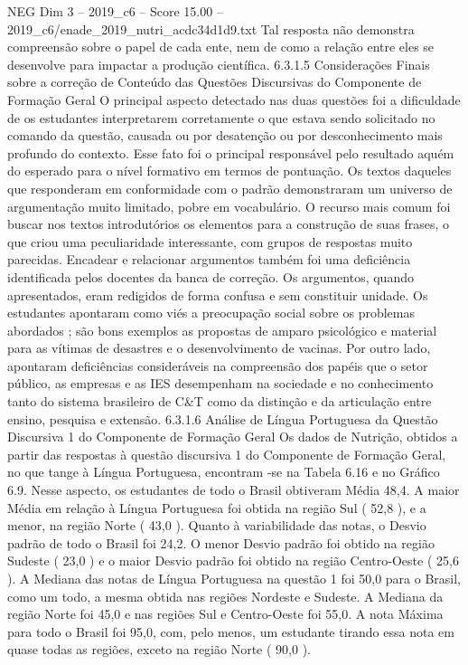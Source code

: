 \begin{textsample}{NEG Dim 3 – 2019\_c6 – Score 15.00 – 2019\_c6/enade\_2019\_nutri\_acdc34d1d9.txt}
Tal resposta não demonstra compreensão sobre o papel de cada ente, nem de como a relação entre eles se desenvolve para impactar a produção científica. 6.3.1.5 Considerações Finais sobre a correção de Conteúdo das Questões Discursivas do Componente de Formação Geral O principal aspecto detectado nas duas questões foi a dificuldade de os estudantes interpretarem corretamente o que estava sendo solicitado no comando da questão, causada ou por desatenção ou por desconhecimento mais profundo do contexto.
Esse fato foi o principal responsável pelo resultado aquém do esperado para o nível formativo em termos de pontuação.
Os textos daqueles que responderam em conformidade com o padrão demonstraram um universo de argumentação muito limitado, pobre em vocabulário.
O recurso mais comum foi buscar nos textos introdutórios os elementos para a construção de suas frases, o que criou uma peculiaridade interessante, com grupos de respostas muito parecidas.
Encadear e relacionar argumentos também foi uma deficiência identificada pelos docentes da banca de correção.
Os argumentos, quando apresentados, eram redigidos de forma confusa e sem constituir unidade.
Os estudantes apontaram como viés a preocupação social sobre os problemas abordados ; são bons exemplos as propostas de amparo psicológico e material para as vítimas de desastres e o desenvolvimento de vacinas.
Por outro lado, apontaram deficiências consideráveis na compreensão dos papéis que o setor público, as empresas e as IES desempenham na sociedade e no conhecimento tanto do sistema brasileiro de C\&T como da distinção e da articulação entre ensino, pesquisa e extensão. 6.3.1.6 Análise de Língua Portuguesa da Questão Discursiva 1 do Componente de Formação Geral Os dados de Nutrição, obtidos a partir das respostas à questão discursiva 1 do Componente de Formação Geral, no que tange à Língua Portuguesa, encontram -se na Tabela 6.16 e no Gráfico 6.9.
Nesse aspecto, os estudantes de todo o Brasil obtiveram Média 48,4.
A maior Média em relação à Língua Portuguesa foi obtida na região Sul ( 52,8 ), e a menor, na região Norte ( 43,0 ).
Quanto à variabilidade das notas, o Desvio padrão de todo o Brasil foi 24,2.
O menor Desvio padrão foi obtido na região Sudeste ( 23,0 ) e o maior Desvio padrão foi obtido na região Centro-Oeste ( 25,6 ).
A Mediana das notas de Língua Portuguesa na questão 1 foi 50,0 para o Brasil, como um todo, a mesma obtida nas regiões Nordeste e Sudeste.
A Mediana da região Norte foi 45,0 e nas regiões Sul e Centro-Oeste foi 55,0.
A nota Máxima para todo o Brasil foi 95,0, com, pelo menos, um estudante tirando essa nota em quase todas as regiões, exceto na região Norte ( 90,0 ).

\end{textsample}

